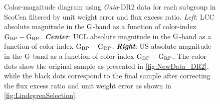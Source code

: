 \begin{figure}[!ht]
\centering
\caption{\scriptsize{Color-magnitude diagram using \textit{Gaia}-DR2 data for each subgroup in ScoCen filtered by unit weight error and flux excess ratio. \textit{Left}: LCC absolute magnitude in the $\textnormal{G}$-band as a function of color-index $\textnormal{G}_\textnormal{BP} - \textnormal{G}_\textnormal{RP}$. \textit{\textbf{Center}}: UCL absolute magnitude in the $\textnormal{G}$-band as a function of color-index $\textnormal{G}_\textnormal{BP} - \textnormal{G}_\textnormal{RP}$. \textit{\textbf{Right}}: US absolute magnitude in the $\textnormal{G}$-band as a function of color-index $\textnormal{G}_\textnormal{BP} - \textnormal{G}_\textnormal{RP}$. The color dots show the original sample as presented in \autoref{fig:NewData_DR2}, while the black dots correspond to the final sample after correcting the flux excess ratio and unit weight error as shown in \autoref{fig:LindegrenSelection}.}}
\label{fig:FinalSample_DR2}
\end{figure}
